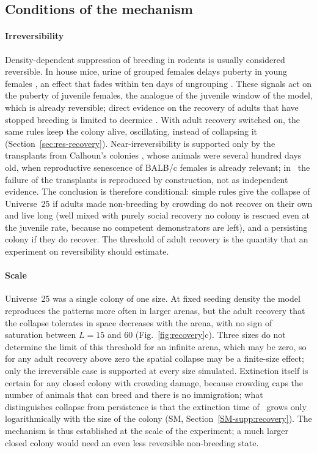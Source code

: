 \subsection{Conditions of the mechanism}
\label{sec:conditions}

\paragraph{Irreversibility}
Density-dependent suppression of breeding in rodents is usually considered reversible. In house mice, urine of grouped females
delays puberty in young females \citep{Drickamer1977}, an effect that fades within ten days of ungrouping
\citep{CoppolaVandenbergh1985}. These signals act on the puberty of juvenile
females, the analogue of the juvenile window of the model, which is already reversible; direct evidence on the
recovery of adults that have stopped breeding is limited to deermice \citep{Terman1973}. With adult recovery
switched on, the same rules keep the colony alive, oscillating, instead of collapsing it
(Section~\ref{sec:res-recovery}). Near-irreversibility is
supported only by the transplants from Calhoun's colonies \citep{Marsden1972}, whose animals were several hundred
days old, when reproductive senescence of BALB/c females is already relevant; in \Cone\ the failure of the
transplants is reproduced by construction, not as independent evidence. The conclusion is therefore conditional:
simple rules give the collapse of Universe~25 if adults made non-breeding by crowding do not recover on their own
and live long (well mixed with purely social recovery no colony is rescued even at the juvenile rate, because no
competent demonstrators are left), and a persisting colony if they do recover. The threshold of adult recovery
is the quantity that an experiment on reversibility should estimate.

\paragraph{Scale}
Universe~25 was a single colony of one size. At fixed seeding density the model reproduces the patterns more often
in larger arenas, but the adult recovery that the collapse tolerates in space decreases with the arena, with no sign
of saturation between $L=15$ and 60 (Fig.~\ref{fig:recovery}c). Three sizes do not determine the limit of this
threshold for an infinite arena, which may be zero, so for any adult recovery above zero the spatial collapse may be
a finite-size effect; only the irreversible case is supported at every size simulated. Extinction itself is certain
for any closed colony with crowding damage, because crowding caps the number of animals that can breed and there is no
immigration; what distinguishes collapse from persistence is that the extinction time
of \Cone\ grows only logarithmically with the size of the colony (SM, Section~\ref{SM-supp:recovery}). The mechanism
is thus established at the scale of the experiment; a much larger closed colony would need an even less reversible
non-breeding state.

